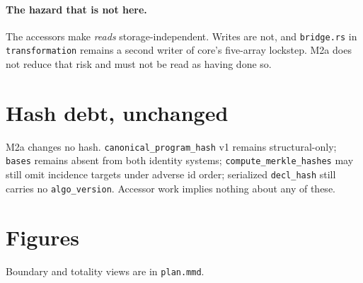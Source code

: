 \documentclass[11pt,a4paper]{article}
\newcommand{\code}[1]{\texttt{#1}}
\begin{document}
\paragraph{The hazard that is not here.} The accessors make \emph{reads}
storage-independent. Writes are not, and \code{bridge.rs} in
\code{transformation} remains a second writer of core's five-array lockstep.
M2a does not reduce that risk and must not be read as having done so.

\section{Hash debt, unchanged}

M2a changes no hash. \code{canonical\_program\_hash} v1 remains structural-only;
\code{bases} remains absent from both identity systems;
\code{compute\_merkle\_hashes} may still omit incidence targets under adverse id
order; serialized \code{decl\_hash} still carries no \code{algo\_version}.
Accessor work implies nothing about any of these.

\section{Figures}



\noindent
Boundary and totality views are in \code{plan.mmd}.
\end{document}
